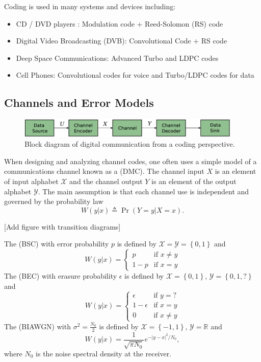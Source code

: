 Coding is used in many systems and devices including:
\begin{itemize}
\item CD / DVD players : Modulation code + Reed-Solomon (RS) code
\item Digital Video Broadcasting (DVB): Convolutional Code + RS code
\item Deep Space Communications: Advanced Turbo and LDPC codes
\item Cell Phones: Convolutional codes for voice and Turbo/LDPC codes for data
\end{itemize}

\subsection{Channels and Error Models}

\begin{figure}[t]
\begin{center}
\includegraphics[width=0.95\textwidth,keepaspectratio]{Figures/commfig2}
\end{center}
\vspace{-4mm}
\caption{Block diagram of digital communication from a coding perspective.}
\end{figure}

When designing and analyzing channel codes, one often uses a simple model of a communications channel known as a  (DMC).
The channel input $X$ is an element of input alphabet $\mathcal{X}$ and the channel output $Y$ is an element of the output alphabet $\mathcal{Y}$.
The main assumption is that each channel use is independent and governed by the probability law
\[ W(y|x) \triangleq \Pr\left(Y=y|X=x\right).\]

[Add figure with transition diagrams]

The  (BSC) with error probability $p$ is defined by $\mathcal{X}=\mathcal{Y}=\left\{ 0,1\right\} $ and
\[ W(y|x)=\begin{cases}
p & \mbox{if }x\neq y\\
1-p & \mbox{if }x=y\end{cases}\]
The  (BEC) with erasure probability $\epsilon$ is defined by $\mathcal{X}=\left\{ 0,1\right\} $, $\mathcal{Y}=\left\{ 0,1,?\right\}$ and
\[ W(y|x)=\begin{cases}
\epsilon & \mbox{if }y=?\\
1-\epsilon & \mbox{if }x=y\\
0 & \mbox{if }x\neq y\end{cases}\]
The  (BIAWGN) with $\sigma^{2}=\frac{N_{0}}{2}$ is defined by $\mathcal{X}=\left\{ -1,1\right\} $, $\mathcal{Y}=\mathbb{R}$ and
\[ W(y|x)=\frac{1}{\sqrt{\pi N_{0}}}e^{-\left|y-x\right|^{2}/N_{0}},\]
where $N_{0}$ is the noise spectral density at the receiver.

